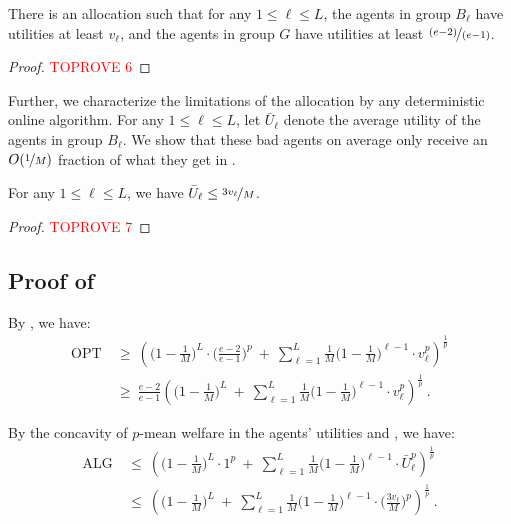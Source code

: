 \documentclass[11pt,letterpaper]{article}
\newcommand{\OPT}{\mathrm{OPT}}
\newcommand{\ALG}{\mathrm{ALG}}
\newcommand{\utility}{U}
\begin{document}
\begin{lemma}
	\label{lem:hardness-nashian-optimal}
	There is an allocation such that for any $1 \le \ell \le L$, the agents in group $B_\ell$ have utilities at least $v_\ell$, and the agents in group $G$ have utilities at least $\nicefrac{(e-2)}{(e-1)}$.
\end{lemma}

\begin{proof}\textcolor{red}{TOPROVE 6}\end{proof}







Further, we characterize the limitations of the allocation by any deterministic online algorithm.
For any $1 \le \ell \le L$, let $\bar{\utility}_\ell$ denote the average utility of the agents in group $B_\ell$.
We show that these bad agents on average only receive an $O(\nicefrac{1}{M})$ fraction of what they get in .



\begin{lemma}
	\label{lem:hardness-nashian-algorithm}
	For any $1 \le \ell \le L$, we have $\bar{\utility}_\ell \le \nicefrac{3 v_\ell}{M}$.
\end{lemma}

\begin{proof}\textcolor{red}{TOPROVE 7}\end{proof}




\subsection{Proof of }

By , we have:
\begin{align*}
	\OPT
	&
	~\ge~ 
	\left( \Big(1-\frac{1}{M}\Big)^L \cdot \Big(\frac{e-2}{e-1}\Big)^p ~+~ \sum_{\ell=1}^L \frac{1}{M} \Big(1 - \frac{1}{M}\Big)^{\ell-1} \cdot v_\ell^p \right)^{\frac{1}{p}} \\
	&
	~\ge~
	\frac{e-2}{e-1}
	\left( \Big(1-\frac{1}{M}\Big)^L ~+~ \sum_{\ell=1}^L \frac{1}{M} \Big(1 - \frac{1}{M}\Big)^{\ell-1} \cdot v_\ell^p \right)^{\frac{1}{p}}
	~.
\end{align*}

By the concavity of $p$-mean welfare in the agents' utilities and , we have:
\begin{align*}
	\ALG
	&
	~\le~
	\left( \Big(1-\frac{1}{M}\Big)^L \cdot 1^p ~+~ \sum_{\ell=1}^L \frac{1}{M} \Big(1 - \frac{1}{M}\Big)^{\ell-1} \cdot \bar{\utility}_\ell^p \right)^{\frac{1}{p}} \\
	&
	~\le~
	\left( \Big(1-\frac{1}{M}\Big)^L ~+~ \sum_{\ell=1}^L \frac{1}{M} \Big(1 - \frac{1}{M}\Big)^{\ell-1} \cdot \Big( \frac{3v_\ell}{M} \Big)^p \right)^{\frac{1}{p}}
	~.
\end{align*}
\end{document}
